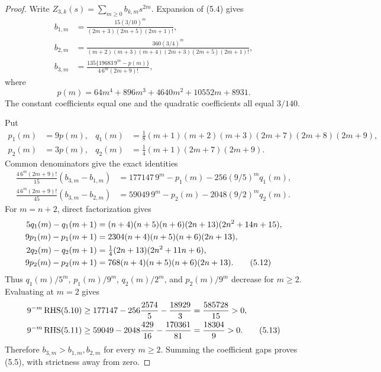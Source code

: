 \documentclass[11pt]{article}
\begin{document}
\begin{proof}
Write $Z_{3,k}(s)=\sum_{m\ge0}b_{k,m}s^{2m}$.  Expansion of (5.4) gives
\begin{align}
b_{1,m}&=\frac{15(3/10)^m}
 {(2m+3)(2m+5)(2m+1)!},                                    \tag{5.6}\\
b_{2,m}&=\frac{360(3/4)^m}
 {(m+2)(m+3)(m+4)(2m+3)(2m+5)(2m+1)!},                     \tag{5.7}\\
b_{3,m}&=\frac{135\{19683\,9^m-p(m)\}}
 {4\,6^m(2m+9)!},                                         \tag{5.8}
\end{align}
where
\begin{equation}
 p(m)=64m^4+896m^3+4640m^2+10552m+8931.                    \tag{5.9}
\end{equation}
The constant coefficients equal one and the quadratic coefficients all
equal $3/140$.

Put
\begin{align*}
p_1(m)&=9p(m),&
q_1(m)&=\tfrac18(m+1)(m+2)(m+3)(2m+7)(2m+8)(2m+9),\\
p_2(m)&=3p(m),&
q_2(m)&=\tfrac14(m+1)(2m+7)(2m+9).
\end{align*}
Common denominators give the exact identities
\begin{align}
 \frac{4\,6^m(2m+9)!}{15}(b_{3,m}-b_{1,m})
 &=177147\,9^m-p_1(m)-256(9/5)^m q_1(m),                   \tag{5.10}\\
 \frac{4\,6^m(2m+9)!}{45}(b_{3,m}-b_{2,m})
 &=59049\,9^m-p_2(m)-2048(9/2)^m q_2(m).                  \tag{5.11}
\end{align}
For $m=n+2$, direct factorization gives
\begin{align}
5q_1(m)-q_1(m+1)
  &=(n+4)(n+5)(n+6)(2n+13)(2n^2+14n+15),\notag\\
9p_1(m)-p_1(m+1)
  &=2304(n+4)(n+5)(n+6)(2n+13),\notag\\
2q_2(m)-q_2(m+1)
  &=\tfrac14(2n+13)(2n^2+11n+6),\notag\\
9p_2(m)-p_2(m+1)
  &=768(n+4)(n+5)(n+6)(2n+13).                              \tag{5.12}
\end{align}
Thus $q_1(m)/5^m$, $p_1(m)/9^m$, $q_2(m)/2^m$, and $p_2(m)/9^m$ decrease
for $m\ge2$.  Evaluating at $m=2$ gives
\begin{align}
9^{-m}\operatorname{RHS}(5.10)
 &\ge177147-256\frac{2574}{5}-\frac{18929}{3}
 =\frac{585728}{15}>0,\notag\\
9^{-m}\operatorname{RHS}(5.11)
 &\ge59049-2048\frac{429}{16}-\frac{170361}{81}
 =\frac{18304}{9}>0.                                      \tag{5.13}
\end{align}
Therefore $b_{3,m}>b_{1,m},b_{2,m}$ for every $m\ge2$.  Summing the
coefficient gaps proves (5.5), with strictness away from zero.
\end{proof}
\end{document}
